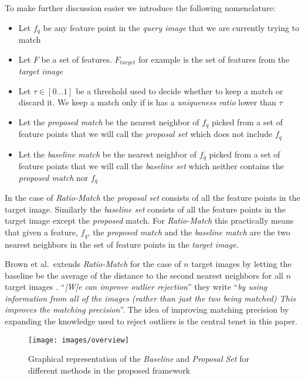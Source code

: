 \documentclass[journal]{IEEEtran}
\begin{document}
To make further discussion easier we introduce the following 
nomenclature:

\begin{itemize}
\item{Let $f_q$ be any feature point in the \emph{query image} that we 
    are currently trying to match}
\item{Let $F$ be a set of features. $F_{target}$ for example is the set 
    of features from the \emph{target image}}
\item{Let $\tau \in [0 \ldots 1]$ be a threshold used to decide whether 
    to keep a match or discard it. We keep a match only if is has a 
\emph{uniqueness ratio} lower than $\tau$}
\item{Let the \emph{proposed match} be the nearest neighbor of $f_q$
    picked from a set of feature points that we will call the 
\emph{proposal set} which does not include $f_q$}
\item{Let the \emph{baseline match} be the nearest neighbor of $f_q$ 
    picked from a set of feature points that we will call the 
\emph{baseline set} which neither contains the \emph{proposed match} nor 
$f_q$}
\end{itemize}

In the case of \emph{Ratio-Match} \cite{lowe2004sift} the \emph{proposal 
set} consists of all the feature points in the target image.  Similarly 
the \emph{baseline set} consists of all the feature points in the target 
image except the \emph{proposed} match. For \emph{Ratio-Match} this 
practically means that given a feature, $f_q$, the \emph{proposed match} 
and the \emph{baseline match} are the two nearest neighbors in the set 
of feature points in the \emph{target image}.

Brown et al.\ extends \emph{Ratio-Match} for the case of $n$ target 
images by letting the baseline be the average of the distance to the 
second nearest neighbors for all $n$ target images 
\cite{brown2005multi}.  ``\emph{[W]e can improve outlier rejection}'' 
they write ``\emph{by using information from all of the images (rather 
than just the two being matched) This improves the matching 
precision}''.  The idea of improving matching precision by expanding the 
knowledge used to reject outliers is the central tenet in this paper.

\begin{figure}[t]
\centering
\texttt{[image: images/overview]}
\caption{Graphical representation of the \emph{Baseline} and 
\emph{Proposal Set} for different methods in the proposed framework}
\label{fig:overview}
\end{figure}
%
\end{document}
